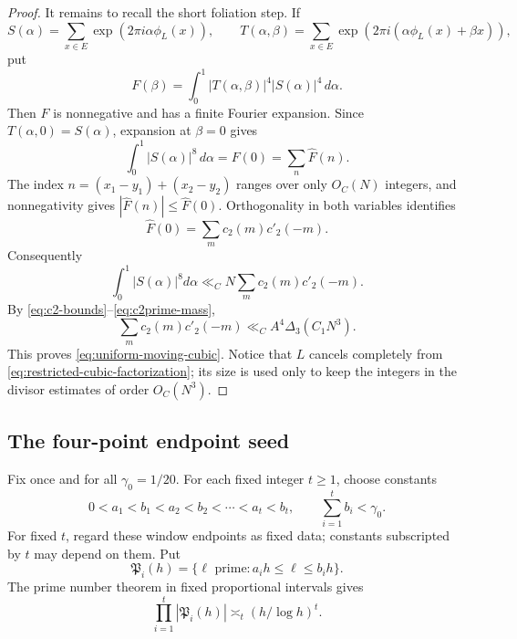 \documentclass[11pt,reqno]{amsart}
\theoremstyle{definition}
\theoremstyle{remark}
\begin{document}
\begin{proof}
It remains to recall the short foliation step.  If
\[
 S(\alpha)=\sum_{x\in E}\exp(2\pi i\alpha\phi_L(x)),\qquad
 T(\alpha,\beta)=
 \sum_{x\in E}\exp(2\pi i(\alpha\phi_L(x)+\beta x)),
\]
put
\[
 F(\beta)=\int_0^1|T(\alpha,\beta)|^4|S(\alpha)|^4\,d\alpha.
\]
Then $F$ is nonnegative and has a finite Fourier expansion.  Since
$T(\alpha,0)=S(\alpha)$, expansion at $\beta=0$ gives
\[
 \int_0^1|S(\alpha)|^8\,d\alpha=F(0)=\sum_n\widehat F(n).
\]
The index $n=(x_1-y_1)+(x_2-y_2)$ ranges over only $O_C(N)$ integers, and
nonnegativity gives $|\widehat F(n)|\leq\widehat F(0)$.  Orthogonality in
both variables identifies
\[
 \widehat F(0)=\sum_m c_2(m)c'_2(-m).
\]
Consequently
\begin{equation}\label{eq:cubic-foliation}
 \int_0^1|S(\alpha)|^8d\alpha
 \ll_C N\sum_m c_2(m)c'_2(-m).
\end{equation}
By \eqref{eq:c2-bounds}--\eqref{eq:c2prime-mass},
\[
 \sum_m c_2(m)c'_2(-m)
 \ll_C A^4\Delta_3(C_1N^3).
\]
This proves \eqref{eq:uniform-moving-cubic}.  Notice that $L$ cancels
completely from \eqref{eq:restricted-cubic-factorization}; its size is used
only to keep the integers in the divisor estimates of order $O_C(N^3)$.
\end{proof}

\subsection{The four-point endpoint seed}

Fix once and for all $\gamma_0=1/20$.  For each fixed integer $t\geq1$,
choose constants
\begin{equation}\label{eq:prime-window-constants}
 0<a_1<b_1<a_2<b_2<\cdots<a_t<b_t,
 \qquad \sum_{i=1}^t b_i<\gamma_0.
\end{equation}
For fixed $t$, regard these window endpoints as fixed data; constants
subscripted by $t$ may depend on them.  Put
\begin{equation}\label{eq:prime-windows}
 \mathfrak P_i(h)=\{\ell\text{ prime}:a_ih\leq\ell\leq b_ih\}.
\end{equation}
The prime number theorem in fixed proportional intervals gives
\begin{equation}\label{eq:prime-tuple-count}
 \prod_{i=1}^t|\mathfrak P_i(h)|\asymp_t(h/\log h)^t.
\end{equation}
\end{document}
